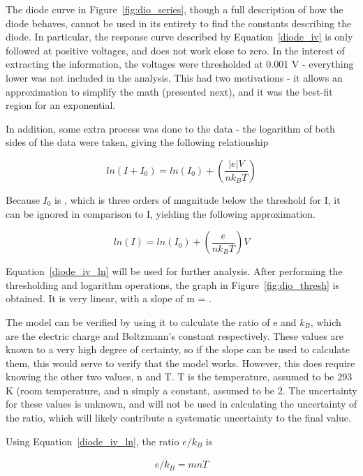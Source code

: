 \documentclass[journal]{IEEEtran}
\begin{document}
The diode curve in Figure~\ref{fig:dio_series}, though a full description of
how the diode behaves, cannot be used in its entirety to find the constants
describing the diode. In particular, the response curve described by
Equation~\ref{diode_iv} is only followed at positive voltages, and does not
work close to zero. In the interest of extracting the information, the voltages
were thresholded at 0.001 V - everything lower was not included in the
analysis. This had two motivations - it allows an approximation to simplify the
math (presented next), and it was the best-fit region for an exponential.

In addition, some extra process was done to the data - the logarithm of both
sides of the data were taken, giving the following relationship

\begin{displaymath}
ln(I + I_0) = ln(I_0) + \left( \frac{|e|V}{n k_B T} \right)
\end{displaymath}

Because $I_0$ is , which is three orders of magnitude
below the threshold for I, it can be ignored in comparison to I, yielding the
following approximation.

\begin{equation}
\label{diode_iv_ln}
ln(I) = ln(I_0) + \left( \frac{e}{n k_B T} \right) V
\end{equation}

Equation~\ref{diode_iv_ln} will be used for further analysis. After performing
the thresholding and logarithm operations, the graph in
Figure~\ref{fig:dio_thresh} is obtained. It is very linear, with a slope of m = .

The model can be verified by using it to calculate the ratio of e and $k_B$,
which are the electric charge and Boltzmann's constant respectively. These
values are known to a very high degree of certainty, so if the slope can be
used to calculate them, this would serve to verify that the model works.
However, this does require knowing the other two values, n and T. T is the
temperature, assumed to be 293 K (room temperature, and n simply a constant,
assumed to be 2. The uncertainty for these values is unknown, and will not be
used in calculating the uncertainty of the ratio, which will likely contribute
a systematic uncertainty to the final value.

Using Equation~\ref{diode_iv_ln}, the ratio $e/k_B$ is

\begin{displaymath}
\overline{e/k_B} = m n T
\end{displaymath}
\end{document}

